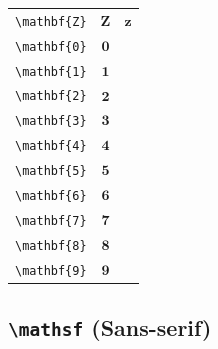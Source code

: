 \documentclass[12pt,a4paper]{article}
\begin{document}
\begin{longtable}{|c|c|c|}
\verb|\mathbf{Z}| & $\mathbf{Z}$ & $\mathbf{z}$ \\ %
\verb|\mathbf{0}| & $\mathbf{0}$ & \\ %
\verb|\mathbf{1}| & $\mathbf{1}$ & \\ %
\verb|\mathbf{2}| & $\mathbf{2}$ & \\ %
\verb|\mathbf{3}| & $\mathbf{3}$ & \\ %
\verb|\mathbf{4}| & $\mathbf{4}$ & \\ %
\verb|\mathbf{5}| & $\mathbf{5}$ & \\ %
\verb|\mathbf{6}| & $\mathbf{6}$ & \\ %
\verb|\mathbf{7}| & $\mathbf{7}$ & \\ %
\verb|\mathbf{8}| & $\mathbf{8}$ & \\ %
\verb|\mathbf{9}| & $\mathbf{9}$ & \\ %
\hline
\end{longtable}

\newpage

\subsection*{\texttt{\textbackslash{}mathsf} (Sans-serif)}
\end{document}
